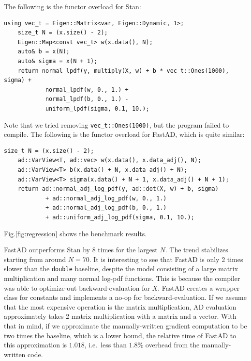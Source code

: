 The following is the functor overload for Stan:
\begin{lstlisting}[style=customcpp]
    using vec_t = Eigen::Matrix<var, Eigen::Dynamic, 1>;
    size_t N = (x.size() - 2);
    Eigen::Map<const vec_t> w(x.data(), N);
    auto& b = x(N);
    auto& sigma = x(N + 1);
    return normal_lpdf(y, multiply(X, w) + b * vec_t::Ones(1000), sigma) +
            normal_lpdf(w, 0., 1.) +
            normal_lpdf(b, 0., 1.) -
            uniform_lpdf(sigma, 0.1, 10.);
\end{lstlisting}
Note that we tried removing \verb|vec_t::Ones(1000)|, but the program failed to compile.
The following is the functor overload for FastAD, which is quite similar:
\begin{lstlisting}[style=customcpp]
    size_t N = (x.size() - 2);
    ad::VarView<T, ad::vec> w(x.data(), x.data_adj(), N);
    ad::VarView<T> b(x.data() + N, x.data_adj() + N);
    ad::VarView<T> sigma(x.data() + N + 1, x.data_adj() + N + 1);
    return ad::normal_adj_log_pdf(y, ad::dot(X, w) + b, sigma) 
            + ad::normal_adj_log_pdf(w, 0., 1.)
            + ad::normal_adj_log_pdf(b, 0., 1.)
            + ad::uniform_adj_log_pdf(sigma, 0.1, 10.);
\end{lstlisting}
Fig.\ref{fig:regression} shows the benchmark results.

FastAD outperforms Stan by 8 times for the largest $N$.
The trend stabilizes starting from around $N=70$.
It is interesting to see that FastAD is only 2 times slower than the \verb|double| baseline,
despite the model consisting of a large matrix multiplication and many normal log-pdf functions.
This is because the compiler was able to optimize-out backward-evaluation for $X$.
FastAD creates a wrapper class for constants and implements a no-op for backward-evaluation.
If we assume that the most expensive operation is the matrix multiplication,
AD evaluation approximately takes 2 matrix multiplication with a matrix and a vector.
With that in mind, if we approximate the manually-written gradient computation
to be two times the baseline, which is a lower bound, the relative time of FastAD to this approximation is
$1.018$, i.e.\ less than $ 1.8\%$ overhead from the manually-written code.
